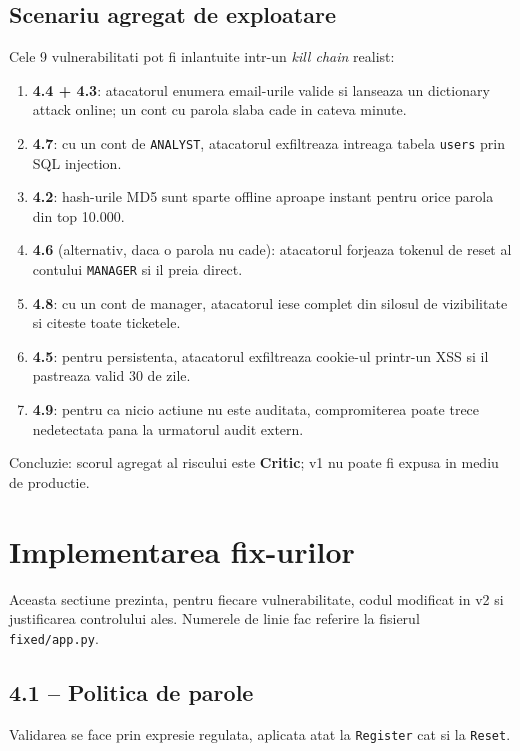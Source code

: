 \documentclass[12pt,a4paper]{article}
\begin{document}
\subsection{Scenariu agregat de exploatare}
Cele 9 vulnerabilitati pot fi inlantuite intr-un \textit{kill chain}
realist:
\begin{enumerate}
  \item \textbf{4.4 + 4.3}: atacatorul enumera email-urile valide si
        lanseaza un dictionary attack online; un cont cu parola slaba
        cade in cateva minute.
  \item \textbf{4.7}: cu un cont de \texttt{ANALYST}, atacatorul exfiltreaza
        intreaga tabela \texttt{users} prin SQL injection.
  \item \textbf{4.2}: hash-urile MD5 sunt sparte offline aproape instant
        pentru orice parola din top 10.000.
  \item \textbf{4.6} (alternativ, daca o parola nu cade): atacatorul
        forjeaza tokenul de reset al contului \texttt{MANAGER} si il
        preia direct.
  \item \textbf{4.8}: cu un cont de manager, atacatorul iese complet
        din silosul de vizibilitate si citeste toate ticketele.
  \item \textbf{4.5}: pentru persistenta, atacatorul exfiltreaza
        cookie-ul printr-un XSS si il pastreaza valid 30 de zile.
  \item \textbf{4.9}: pentru ca nicio actiune nu este auditata,
        compromiterea poate trece nedetectata pana la urmatorul audit
        extern.
\end{enumerate}
Concluzie: scorul agregat al riscului este \textbf{Critic}; v1 nu poate
fi expusa in mediu de productie.

\newpage
\section{Implementarea fix-urilor}\label{sec:fix}

Aceasta sectiune prezinta, pentru fiecare vulnerabilitate, codul
modificat in v2 si justificarea controlului ales. Numerele de linie
fac referire la fisierul \texttt{fixed/app.py}.

\subsection{4.1 -- Politica de parole}
Validarea se face prin expresie regulata, aplicata atat la \texttt{Register}
cat si la \texttt{Reset}.
\end{document}

